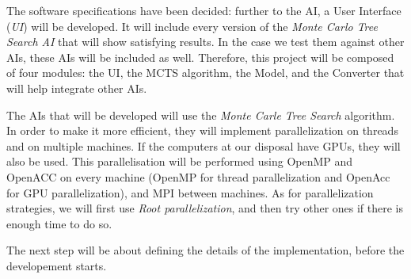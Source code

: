 The software specifications have been decided: further to the AI, a User Interface (\emph{UI}) will be developed.
It will include every version of the \textit{Monte Carlo Tree Search AI} that will show satisfying results.
In the case we test them against other AIs, these AIs will be included as well.
Therefore, this project will be composed of four modules: the UI, the MCTS algorithm, the Model, and the Converter that will help integrate other AIs.

The AIs that will be developed will use the \emph{Monte Carle Tree Search} algorithm.
In order to make it more efficient, they will implement parallelization on threads and on multiple machines.
If the computers at our disposal have GPUs, they will also be used.
This parallelisation will be performed using OpenMP and OpenACC on every machine (OpenMP for thread parallelization and OpenAcc for GPU parallelization), and MPI between machines.
As for parallelization strategies, we will first use \emph{Root parallelization}, and then try other ones if there is enough time to do so.

The next step will be about defining the details of the implementation, before the developement starts.
